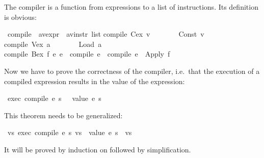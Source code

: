 \begin{isabellebody}
\begin{isamarkuptext}
The compiler is a function from expressions to a list of instructions. Its
definition is obvious:%
\end{isamarkuptext}%
\isamarkuptrue%
\isamarkupfalse%
\ compile\ {\isacharcolon}{\isacharcolon}\ {\isachardoublequoteopen}{\isacharparenleft}{\isacharprime}a{\isacharcomma}{\isacharprime}v{\isacharparenright}expr\ {\isasymRightarrow}\ {\isacharparenleft}{\isacharprime}a{\isacharcomma}{\isacharprime}v{\isacharparenright}instr\ list{\isachardoublequoteclose}\isanewline
{}\isamarkupfalse%
\isanewline
{\isachardoublequoteopen}compile\ {\isacharparenleft}Cex\ v{\isacharparenright}\ \ \ \ \ \ \ {\isacharequal}\ {\isacharbrackleft}Const\ v{\isacharbrackright}{\isachardoublequoteclose}\isanewline
{\isachardoublequoteopen}compile\ {\isacharparenleft}Vex\ a{\isacharparenright}\ \ \ \ \ \ \ {\isacharequal}\ {\isacharbrackleft}Load\ a{\isacharbrackright}{\isachardoublequoteclose}\isanewline
{\isachardoublequoteopen}compile\ {\isacharparenleft}Bex\ f\ e{}\ e{}{\isacharparenright}\ {\isacharequal}\ {\isacharparenleft}compile\ e{}{\isacharparenright}\ {\isacharat}\ {\isacharparenleft}compile\ e{}{\isacharparenright}\ {\isacharat}\ {\isacharbrackleft}Apply\ f{\isacharbrackright}{\isachardoublequoteclose}%
\begin{isamarkuptext}%
Now we have to prove the correctness of the compiler, i.e.\ that the
execution of a compiled expression results in the value of the expression:%
\end{isamarkuptext}%
\isamarkuptrue%
\isamarkupfalse%
\ {\isachardoublequoteopen}exec\ {\isacharparenleft}compile\ e{\isacharparenright}\ s\ {\isacharbrackleft}{\isacharbrackright}\ {\isacharequal}\ {\isacharbrackleft}value\ e\ s{\isacharbrackright}{\isachardoublequoteclose}%
\isadelimproof
%
\endisadelimproof
%
\isatagproof
%
\endisatagproof
{\isafoldproof}%
%
\isadelimproof
%
\endisadelimproof
%
\begin{isamarkuptext}%
\noindent
This theorem needs to be generalized:%
\end{isamarkuptext}%
\isamarkuptrue%
\isamarkupfalse%
\ {\isachardoublequoteopen}{\isasymforall}vs{\isachardot}\ exec\ {\isacharparenleft}compile\ e{\isacharparenright}\ s\ vs\ {\isacharequal}\ {\isacharparenleft}value\ e\ s{\isacharparenright}\ {\isacharhash}\ vs{\isachardoublequoteclose}%
\isadelimproof
%
\endisadelimproof
%
\isatagproof
%
\begin{isamarkuptxt}%
\noindent
It will be proved by induction on  followed by simplification.  

\end{isamarkuptxt}
\end{isabellebody}
